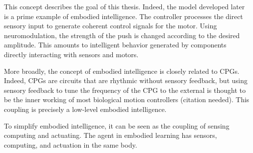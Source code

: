This concept describes the goal of this thesis.
Indeed, the model developed later is a prime example of embodied intelligence.
The controller processes the direct sensory input to generate coherent control signals for the motor. 
Using neuromodulation, the strength of the push is changed according to the desired amplitude.
This amounts to intelligent behavior generated by components directly interacting with sensors and motors.

More broadly, the concept of embodied intelligence is closely related to CPGs.
Indeed, CPGs are circuits that are rhythmic without sensory feedback, but using sensory feedback to tune the frequency of the CPG to the external is thought to be the inner working of most biological motion controllers (citation needed).
This coupling is precisely a low-level embodied intelligence.

To simplify embodied intelligence, it can be seen as the coupling of sensing computing and actuating.
The agent in embodied learning has sensors, computing, and actuation in the same body.
